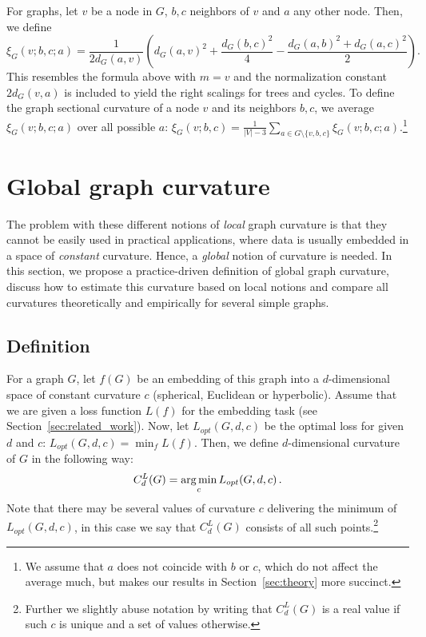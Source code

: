 \documentclass{article} %
\begin{document}
For graphs, let $v$ be a node in $G$, $b,c$ neighbors of $v$ and $a$ any other node. Then, we define
\begin{equation}
\xi_G(v;b,c;a) = \frac{1}{2 d_G(a,v)} \left( d_G(a,v)^2 + \frac{d_G(b,c)^2}{4} - \frac{d_G(a,b)^2 + d_G(a,c)^2}{2} \right).
\end{equation}
This resembles
the formula above
with $m = v$ and the normalization constant $2d_G(v,a)$ is included to yield the right scalings for trees and cycles.
To define the graph sectional curvature of a node $v$ and its neighbors $b,c$, we average $\xi_G(v;b,c;a)$ over all possible $a$: 
$\xi_G(v; b,c) = \frac{1}{|V|-3} \sum_{a \in G\setminus \{v,b,c\}} \xi_G(v;b,c;a)$.\footnote{We assume that $a$ does not coincide with $b$ or $c$, which do not affect the average much, but makes our results in Section~\ref{sec:theory} more succinct.}

\section{Global graph curvature}\label{sec:global}

The problem with these different notions of \textit{local} graph curvature is that they cannot be easily used in practical applications, where data is usually embedded in a space of \textit{constant} curvature.
Hence, a \textit{global} notion of curvature is needed. 
In this section, we propose a practice-driven definition of global graph curvature, discuss how to estimate this curvature based on local notions and compare all curvatures theoretically and empirically for several simple graphs.

\subsection{Definition}\label{sec:global_curvature_definition}

For a graph $G$, let $f(G)$ be an embedding of this graph into a $d$-dimensional space of constant curvature $c$ (spherical, Euclidean or hyperbolic). 
Assume that we are given a loss function $L(f)$ for the embedding task (see Section~\ref{sec:related_work}).
Now, let $L_{opt}(G,d,c)$ be the optimal loss for given $d$ and $c$:
$L_{opt}(G,d,c) = \min_{f} L(f).$
Then, we define $d$-dimensional curvature of $G$ in the following way:
\begin{equation}\label{eq:global_curvature}
C_{d}^{L}(G) = \operatorname*{arg\,min}_c L_{opt}(G,d,c)\,.
\end{equation}
Note that there may be several values of curvature $c$ delivering the minimum of $L_{opt}(G,d,c)$, in this case we say that  $C_{d}^{L}(G)$ consists of all such points.\footnote{Further we slightly abuse notation by writing that $C_{d}^{L}(G)$ is a real value if such $c$ is unique and a set of values otherwise.}
\end{document}
